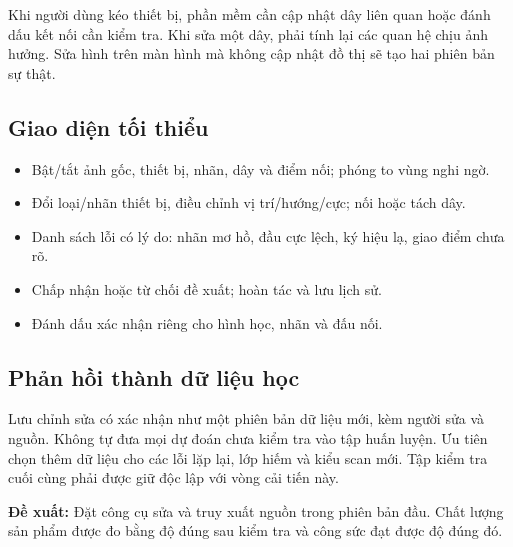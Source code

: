\documentclass[11pt,a4paper]{article}
\newcommand{\decision}[1]{\par\smallskip\noindent\colorbox{Pale}{\parbox{\dimexpr\linewidth-2\fboxsep\relax}{\textbf{Đề xuất:} #1}}\par\smallskip}
\begin{document}
Khi người dùng kéo thiết bị, phần mềm cần cập nhật dây liên quan hoặc đánh dấu kết nối cần kiểm tra. Khi sửa một dây, phải tính lại các quan hệ chịu ảnh hưởng. Sửa hình trên màn hình mà không cập nhật đồ thị sẽ tạo hai phiên bản sự thật.

\subsection{Giao diện tối thiểu}
\begin{itemize}
\item Bật/tắt ảnh gốc, thiết bị, nhãn, dây và điểm nối; phóng to vùng nghi ngờ.
\item Đổi loại/nhãn thiết bị, điều chỉnh vị trí/hướng/cực; nối hoặc tách dây.
\item Danh sách lỗi có lý do: nhãn mơ hồ, đầu cực lệch, ký hiệu lạ, giao điểm chưa rõ.
\item Chấp nhận hoặc từ chối đề xuất; hoàn tác và lưu lịch sử.
\item Đánh dấu xác nhận riêng cho hình học, nhãn và đấu nối.
\end{itemize}

\subsection{Phản hồi thành dữ liệu học}
Lưu chỉnh sửa có xác nhận như một phiên bản dữ liệu mới, kèm người sửa và nguồn. Không tự đưa mọi dự đoán chưa kiểm tra vào tập huấn luyện. Ưu tiên chọn thêm dữ liệu cho các lỗi lặp lại, lớp hiếm và kiểu scan mới. Tập kiểm tra cuối cùng phải được giữ độc lập với vòng cải tiến này.

\decision{Đặt công cụ sửa và truy xuất nguồn trong phiên bản đầu. Chất lượng sản phẩm được đo bằng độ đúng sau kiểm tra và công sức đạt được độ đúng đó.}

\clearpage
\end{document}
